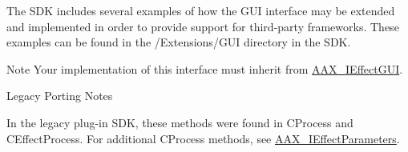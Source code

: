 The S\+D\+K includes several examples of how the G\+U\+I interface may be extended and implemented in order to provide support for third-\/party frameworks. These examples can be found in the /\+Extensions/\+G\+U\+I directory in the S\+D\+K.

\begin{DoxyNote}{Note}
Your implementation of this interface must inherit from \hyperlink{a00098}{A\+A\+X\+\_\+\+I\+Effect\+G\+U\+I}.
\end{DoxyNote}
\begin{DoxyRefDesc}{Legacy Porting Notes}
\item[\hyperlink{a00384__porting_notes000030}{Legacy Porting Notes}]In the legacy plug-\/in S\+D\+K, these methods were found in C\+Process and C\+Effect\+Process. For additional C\+Process methods, see \hyperlink{a00099}{A\+A\+X\+\_\+\+I\+Effect\+Parameters}.\end{DoxyRefDesc}
